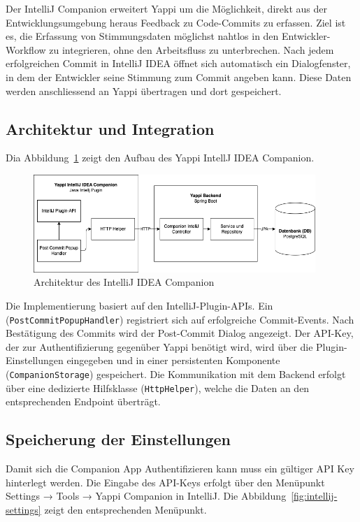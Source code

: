 \documentclass[12pt,a4paper]{report}
\begin{document}
Der IntelliJ Companion erweitert Yappi um die Möglichkeit, direkt aus der Entwicklungsumgebung heraus Feedback zu Code-Commits
zu erfassen. Ziel ist es, die Erfassung von Stimmungsdaten möglichst nahtlos in den Entwickler-Workflow zu integrieren, ohne den
Arbeitsfluss zu unterbrechen. Nach jedem erfolgreichen Commit in IntelliJ IDEA öffnet sich automatisch ein Dialogfenster, in dem
der Entwickler seine Stimmung zum Commit angeben kann. Diese Daten werden anschliessend an Yappi übertragen und dort gespeichert.

\subsection{Architektur und Integration}

Dia Abbildung~\ref{fig:intellij-system-diagram} zeigt den Aufbau des Yappi IntellJ IDEA Companion.

\begin{figure}[H]
\centering
\includegraphics[width=0.95\textwidth]{../figures/intellij-system-diagram.drawio.png}
\caption{Architektur des IntelliJ IDEA Companion}
\label{fig:intellij-system-diagram}
\end{figure}

Die Implementierung basiert auf den IntelliJ-Plugin-APIs. Ein (\texttt{PostCommitPopupHandler}) registriert sich auf erfolgreiche
Commit-Events. Nach Bestätigung des Commits wird der Post-Commit Dialog angezeigt. Der API-Key, der zur Authentifizierung
gegenüber Yappi benötigt wird, wird über die Plugin-Einstellungen eingegeben und in einer persistenten Komponente
(\texttt{CompanionStorage}) gespeichert. Die Kommunikation mit dem Backend erfolgt über eine dedizierte Hilfsklasse
(\texttt{HttpHelper}), welche die Daten an den entsprechenden Endpoint überträgt.

\subsection{Speicherung der Einstellungen}

Damit sich die Companion App Authentifizieren kann muss ein gültiger API Key hinterlegt werden. Die Eingabe des API-Keys erfolgt
über den Menüpunkt Settings → Tools → Yappi Companion in IntelliJ. Die Abbildung~\ref{fig:intellij-settings} zeigt den 
entsprechenden Menüpunkt.
\end{document}
